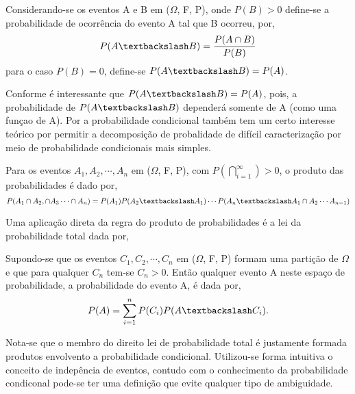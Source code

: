   \begin{defin}
	Considerando-se os eventos A e B em ($\Omega$, F, P), onde $P(B)  > 0$ define-se a probabilidade de ocorr\^{e}ncia do evento
	A tal que B ocorreu, por,
	\begin{equation*}
	  P(A \textbackslash B) = \frac{P(A \cap B)} {P(B)}
	\end{equation*}
	para o caso $P(B) = 0$, define-se $P(A\textbackslash B ) = P(A) $.
  \end{defin}
  Conforme \cite{james} \'{e} interessante que $P(A \textbackslash B) = P(A)$, pois, a probabilidade de $P(A \textbackslash B)$
  depender\'{a} somente de A (como uma fun\c{c}ao de A). Por \cite{magalhaes} a probabilidade condicional tamb\'{e}m tem um certo
  interesse te\'{o}rico por permitir a decomposi\c{c}\~{a}o de probalidade de dif\'{i}cil caracteriza\c{c}\~{a}o por meio
  de probabilidade condicionais mais simples.
  \begin{prop}
	Para os eventos $A_1,A_2, \cdots, A_n$ em ($\Omega$, F, P), com $P( \bigcap\limits_{i = 1}^{\infty}) > 0 $,
	o produto das probabilidades \'{e} dado por,
	\begin{equation*}
	  P(A_1 \cap A_2, \cap A_3 \cdots \cap A_n) = P(A_1)P(A_2 \textbackslash A_1) \cdots P(A_n\textbackslash A_1 \cap A_2 \cdots A_{n-1})
   \end{equation*}
 \end{prop}
 Uma aplica\c{c}\~{a}o direta da regra do produto de probabilidades \'{e} a lei da probabilidade total dada por,
 \begin{teo}
   Supondo-se que os eventos $C_1,C_2,\cdots, C_n$ em ($\Omega$, F, P) formam uma parti\c{c}\~{a}o de $\Omega$ e que para
   qualquer $C_n$ tem-se $C_n > 0$. Ent\~{a}o qualquer evento A neste espa\c{c}o de probabilidade, a probabilidade do evento A,
   \'{e} dada por, 
   \begin{equation*}
	 P(A) = \sum\limits_{i = 1}^{n} P(C_i)P(A \textbackslash C_i).
   \end{equation*}
 \end{teo}
 Nota-se que o membro do direito lei de probabilidade total \'{e} justamente formada produtos envolvento a probabilidade condicional. 
 Utilizou-se forma intuitiva o conceito de indep\^{e}ncia de eventos, contudo com o conhecimento da probabilidade condiconal
 pode-se ter uma defini\c{c}\~{a}o que evite qualquer tipo de ambiguidade.
